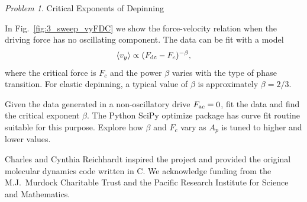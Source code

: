\documentclass[preprint,showpacs,preprintnumbers,amsmath,amssymb,aps,prb]{revtex4-1}
\theoremstyle{remark}
\newtheorem{problem}{Problem}
\begin{document}
 \begin{problem}{Critical Exponents of Depinning}
   \label{ex:critical}
 
   \noindent
   In Fig.~\ref{fig:3_sweep_vyFDC}
   we show the force-velocity relation when
   the driving force has 
   no oscillating component.
   The data can be fit with a model 
   \begin{equation}
     \langle v_y \rangle \propto (F_{\rm dc}-F_c)^{-\beta},
   \end{equation}
   where
   the critical force is $F_c$ and 
   the power $\beta$ varies with the
   type of phase transition.
   For elastic depinning, a
   typical value of $\beta$ is
   approximately $\beta = 2/3$.\cite{Reichhardt2017} 
   
   Given the data generated in 
   a non-oscillatory drive $F_{\rm ac} = 0$,
   fit the data and find the critical exponent $\beta$.
   The Python SciPy optimize package has curve fit routine
   suitable for this purpose.  
   Explore how $\beta$ and $F_c$ vary as $A_p$
   is tuned to higher and lower values.
   
  \end{problem}

\begin{acknowledgments}
Charles and Cynthia Reichhardt
  inspired the project and
  provided the original molecular dynamics code
  written in  C.
  We acknowledge funding from the M.J.\ Murdock Charitable Trust
  and the Pacific Research Institute for Science and Mathematics.

\end{acknowledgments}
 
\end{document}
